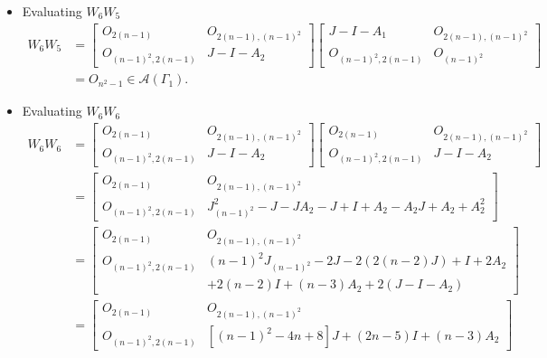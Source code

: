 \begin{itemize}
    \item Evaluating $W_6W_5$
    \begin{align*}
        W_6W_5
        &= \begin{bmatrix}
            O_{2(n-1)} & O_{2(n-1), (n-1)^2} \\
            O_{(n-1)^2, 2(n-1)} & J-I-A_2
        \end{bmatrix}\begin{bmatrix}
            J-I-A_1 & O_{2(n-1), (n-1)^2} \\
            O_{(n-1)^2, 2(n-1)} & O_{(n-1)^2}
        \end{bmatrix}\\
        &= O_{n^2-1}\in\mathcal{A}(\Gamma_1).
    \end{align*}
    
    \item Evaluating $W_6W_6$
    \begin{align*}
        W_6W_6
        &= \begin{bmatrix}
            O_{2(n-1)} & O_{2(n-1), (n-1)^2} \\
            O_{(n-1)^2, 2(n-1)} & J-I-A_2
        \end{bmatrix}\begin{bmatrix}
            O_{2(n-1)} & O_{2(n-1), (n-1)^2} \\
            O_{(n-1)^2, 2(n-1)} & J-I-A_2
        \end{bmatrix}\\
        &= \begin{bmatrix}
            O_{2(n-1)} & O_{2(n-1), (n-1)^2} \\
            O_{(n-1)^2, 2(n-1)} & J_{(n-1)^2}^2-J-JA_2-J+I+A_2 - A_2J + A_2+A_2^2
        \end{bmatrix}\\
        &= \begin{bmatrix}
            O_{2(n-1)} & O_{2(n-1), (n-1)^2} \\
            O_{(n-1)^2, 2(n-1)} & (n-1)^2J_{(n-1)^2}-2J-2(2(n-2)J)+I+2A_2\\&+2(n-2)I+(n-3)A_2+2(J-I-A_2)
        \end{bmatrix}\\
        &= \begin{bmatrix}
            O_{2(n-1)} & O_{2(n-1), (n-1)^2} \\
            O_{(n-1)^2, 2(n-1)} & [(n-1)^2-4n+8]J + (2n-5)I + (n-3)A_2
        \end{bmatrix}\\

\end{align*}
\end{itemize}
